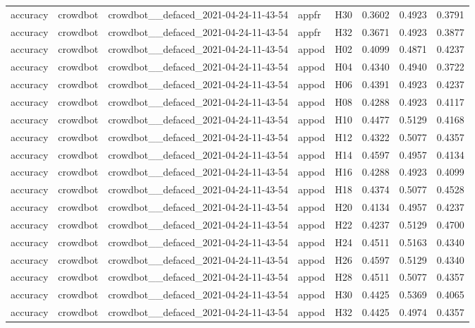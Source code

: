 \begin{table}[tbp]
\begin{tabular}{lllllrrr}
accuracy & crowdbot & crowdbot\_\_defaced\_2021-04-24-11-43-54 & appfr & H30 & 0.3602 & 0.4923 & 0.3791 \\
accuracy & crowdbot & crowdbot\_\_defaced\_2021-04-24-11-43-54 & appfr & H32 & 0.3671 & 0.4923 & 0.3877 \\
accuracy & crowdbot & crowdbot\_\_defaced\_2021-04-24-11-43-54 & appod & H02 & 0.4099 & 0.4871 & 0.4237 \\
accuracy & crowdbot & crowdbot\_\_defaced\_2021-04-24-11-43-54 & appod & H04 & 0.4340 & 0.4940 & 0.3722 \\
accuracy & crowdbot & crowdbot\_\_defaced\_2021-04-24-11-43-54 & appod & H06 & 0.4391 & 0.4923 & 0.4237 \\
accuracy & crowdbot & crowdbot\_\_defaced\_2021-04-24-11-43-54 & appod & H08 & 0.4288 & 0.4923 & 0.4117 \\
accuracy & crowdbot & crowdbot\_\_defaced\_2021-04-24-11-43-54 & appod & H10 & 0.4477 & 0.5129 & 0.4168 \\
accuracy & crowdbot & crowdbot\_\_defaced\_2021-04-24-11-43-54 & appod & H12 & 0.4322 & 0.5077 & 0.4357 \\
accuracy & crowdbot & crowdbot\_\_defaced\_2021-04-24-11-43-54 & appod & H14 & 0.4597 & 0.4957 & 0.4134 \\
accuracy & crowdbot & crowdbot\_\_defaced\_2021-04-24-11-43-54 & appod & H16 & 0.4288 & 0.4923 & 0.4099 \\
accuracy & crowdbot & crowdbot\_\_defaced\_2021-04-24-11-43-54 & appod & H18 & 0.4374 & 0.5077 & 0.4528 \\
accuracy & crowdbot & crowdbot\_\_defaced\_2021-04-24-11-43-54 & appod & H20 & 0.4134 & 0.4957 & 0.4237 \\
accuracy & crowdbot & crowdbot\_\_defaced\_2021-04-24-11-43-54 & appod & H22 & 0.4237 & 0.5129 & 0.4700 \\
accuracy & crowdbot & crowdbot\_\_defaced\_2021-04-24-11-43-54 & appod & H24 & 0.4511 & 0.5163 & 0.4340 \\
accuracy & crowdbot & crowdbot\_\_defaced\_2021-04-24-11-43-54 & appod & H26 & 0.4597 & 0.5129 & 0.4340 \\
accuracy & crowdbot & crowdbot\_\_defaced\_2021-04-24-11-43-54 & appod & H28 & 0.4511 & 0.5077 & 0.4357 \\
accuracy & crowdbot & crowdbot\_\_defaced\_2021-04-24-11-43-54 & appod & H30 & 0.4425 & 0.5369 & 0.4065 \\
accuracy & crowdbot & crowdbot\_\_defaced\_2021-04-24-11-43-54 & appod & H32 & 0.4425 & 0.4974 & 0.4357 \\

\end{tabular}
\end{table}

